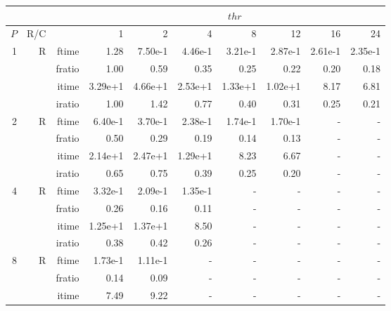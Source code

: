 \documentclass[a4paper]{article}
\begin{document}
\begin{table}[htbp]
\begin{center}
\begin{small}
\begin{tabular}{|r|r|r|r|r|r|r|r|r|r|}
\hline 
     & & & \multicolumn{7}{c|}{$thr$} \\ \hline
    $P$ & R/C &  & 1           & 2    & 4    & 8    & 12   & 16    & 24  \\ \hline\hline
   1 &  R &   ftime &    1.28  &    7.50e-1 &    4.46e-1 &    3.21e-1 &    2.87e-1 &    2.61e-1 &    2.35e-1 \\
             &             &  fratio &    1.00 &   0.59 &    0.35 &    0.25 &    0.22 &    0.20 &    0.18 \\
             &             &  itime &    3.29e+1 &   4.66e+1 &   2.53e+1 &   1.33e+1 &   1.02e+1 &   8.17  &    6.81  \\
             &             &  iratio &    1.00 &    1.42  &    0.77 &    0.40 &    0.31 &    0.25 &   0.21 \\\hline
   2 &  R &   ftime &    6.40e-1 &    3.70e-1 &    2.38e-1 &    1.74e-1 &    1.70e-1 &      - &      - \\
             &             &  fratio &    0.50 &   0.29 &   0.19 &    0.14 &    0.13 &      - &      - \\
             &             &  itime &    2.14e+1 &   2.47e+1 &   1.29e+1 &   8.23  &    6.67  &      - &      - \\
             &             &  iratio &    0.65 &    0.75 &    0.39 &    0.25 &    0.20 &      - &      - \\\hline
   4 &  R &   ftime &    3.32e-1 &    2.09e-1 &    1.35e-1 &      - &      - &      - &      - \\
             &             &  fratio &    0.26 &    0.16 &   0.11 &      - &      - &      - &      - \\
             &             &  itime &    1.25e+1 &   1.37e+1 &   8.50  &      - &      - &      - &      - \\
             &             &  iratio &    0.38 &   0.42 &    0.26 &      - &      - &      - &      - \\\hline
   8 &   R &   ftime &    1.73e-1 &    1.11e-1 &      - &      - &      - &      - &      - \\
             &             &  fratio &    0.14 &    0.09 &     - &      - &      - &      - &      - \\
             &             &  itime &    7.49  &    9.22  &      - &      - &      - &      - &      - \\

\end{tabular}
\end{small}
\end{center}
\end{table}
\end{document}
